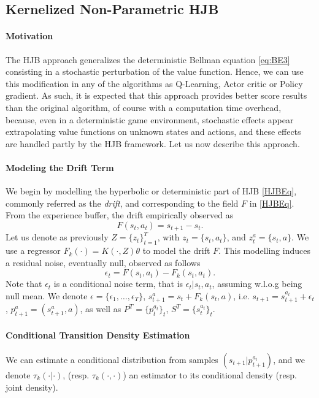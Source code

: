 \documentclass[
]{article}
\numberwithin{equation}{section}
\begin{document}
\subsection{Kernelized Non-Parametric HJB}\label{KHJB}

\paragraph*{Motivation} The HJB approach generalizes the deterministic Bellman equation \eqref{eq:BE3} consisting in a stochastic perturbation of the value function. Hence, we can use this modification in any of the algorithms as Q-Learning, Actor critic or Policy gradient. As such, it is expected that this approach provides better score results than the original algorithm, of course with a computation time overhead, because, even in a deterministic game environment, stochastic effects appear extrapolating value functions on unknown states and actions, and these effects are handled partly by the HJB framework. Let us now describe this approach.

\paragraph*{Modeling the Drift Term} We begin by modelling the hyperbolic or deterministic part of HJB \eqref{HJBEq}, commonly referred as the \textit{drift}, and corresponding to the field $F$ in \eqref{HJBEq}. From the experience buffer, the drift empirically observed as
\begin{equation}
 F(s_t,a_t) = s_{t+1}-s_t.
\end{equation}
Let us denote as previously $Z=\{z_t\}_{t=1}^T$, with $z_t= \{s_t,a_t\}$, and $z_t^a=\{s_t,a\}$. We use a regressor $F_{k}(\cdot) = K(\cdot,Z) \theta$ to model the drift $F$. This modelling induces a residual noise, eventually null, observed as follows
\begin{equation}
 \epsilon_t = F(s_t,a_t) - F_{k}(s_t,a_t).
\end{equation}
Note that $\epsilon_t$ is a conditional noise term, that is $\epsilon_t | s_t,a_t$, 
assuming w.l.o.g being null mean. We denote $\epsilon=\{\epsilon_1,\ldots,\epsilon_T\}$, $s_{t+1}^a = s_t+F_k(s_t,a)$, i.e. $s_{t+1}=s_{t+1}^{a_t} + \epsilon_t$, $p_{t+1}^a = (s_{t+1}^a,a)$, as well as $P^T=\{p_{t}^{a_t}\}_t$, $S^T=\{s_{t}^{a_t}\}_t$. 

\paragraph*{Conditional Transition Density Estimation} We can estimate a conditional distribution from samples $(s_{t+1} | p_{t+1}^{a_t} )$, and we denote $\tau_k(\cdot | \cdot)$, (resp. $\tau_k(\cdot, \cdot)$) an estimator to its conditional density (resp. joint density).
\end{document}
